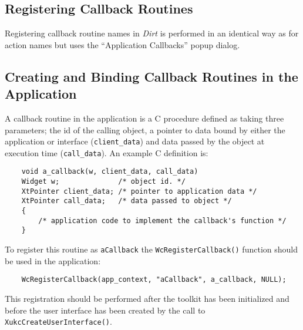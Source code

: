 \subsection{Registering Callback Routines}
\label{sec:callbacks}
Registering callback routine names in {\em Dirt} is performed in an identical
way as for action names but uses the ``Application Callbacks'' popup dialog.

\subsection{Creating and Binding Callback Routines in the Application}
\label{sec:bind-callbacks}
A callback routine in the application is a C procedure defined as taking
three parameters; the id of the calling object, a pointer to data 
bound by either the application or interface ({\tt client\_data}) and 
data passed by the object at execution time ({\tt call\_data}).  An 
example C definition is:\begin{verbatim}
    void a_callback(w, client_data, call_data)
    Widget w;              /* object id. */
    XtPointer client_data; /* pointer to application data */
    XtPointer call_data;   /* data passed to object */
    {
        /* application code to implement the callback's function */
    }
\end{verbatim}
To register this routine as {\tt aCallback} the {\tt WcRegisterCallback()}
function should be used in the application:\begin{verbatim}
    WcRegisterCallback(app_context, "aCallback", a_callback, NULL);
\end{verbatim}
This registration should be performed after the toolkit has been 
initialized and before the user interface has been created by the call 
to {\tt XukcCreateUserInterface()}.

